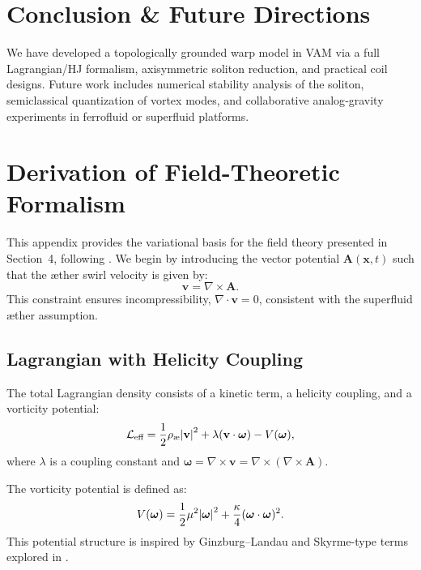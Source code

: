 \documentclass[preprint,notitlepage]{revtex4-2}
\begin{document}
\section{Conclusion \& Future Directions}
    We have developed a topologically grounded warp model in VAM via a full Lagrangian/HJ formalism, axisymmetric soliton reduction, and practical coil designs. Future work includes numerical stability analysis of the soliton, semiclassical quantization of vortex modes, and collaborative analog‐gravity experiments in ferrofluid or superfluid platforms.




\appendix
    \section{Derivation of Field-Theoretic Formalism}\label{sec:field_theory}
    
    This appendix provides the variational basis for the field theory presented in Section~4, following \cite{VAM-1, VAM-2, VAM-4}. We begin by introducing the vector potential $\mathbf{A}(\mathbf{x},t)$ such that the æther swirl velocity is given by:
    \begin{equation}
    \mathbf{v} = \nabla \times \mathbf{A}.
    \end{equation}
    This constraint ensures incompressibility, $\nabla \cdot \mathbf{v} = 0$, consistent with the superfluid æther assumption.
    
    \subsection*{Lagrangian with Helicity Coupling}
    The total Lagrangian density consists of a kinetic term, a helicity coupling, and a vorticity potential:
    \begin{equation}
    \mathcal{L}_{\text{eff}} = \frac{1}{2} \rho_{\text{\ae}} \abs{\mathbf{v}}^2 + \lambda (\mathbf{v} \cdot \boldsymbol{\omega}) - V(\boldsymbol{\omega}),
    \end{equation}
    where $\lambda$ is a coupling constant and $\boldsymbol{\omega} = \nabla \times \mathbf{v} = \nabla \times (\nabla \times \mathbf{A})$.
    
    The vorticity potential is defined as:
    \begin{equation}
    V(\boldsymbol{\omega}) = \frac{1}{2} \mu^2 \abs{\boldsymbol{\omega}}^2 + \frac{\kappa}{4} (\boldsymbol{\omega} \cdot \boldsymbol{\omega})^2.
    \end{equation}
    This potential structure is inspired by Ginzburg–Landau and Skyrme-type terms explored in \cite{VAM-2, VAM-10}.
    
\end{document}
